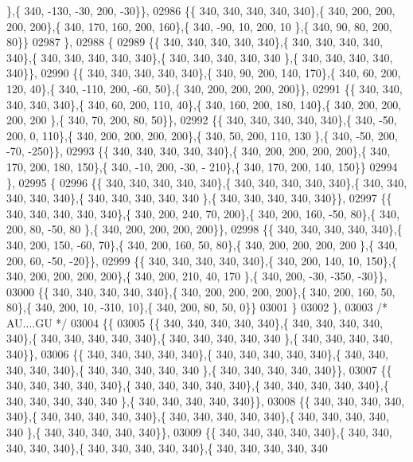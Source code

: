 \begin{DoxyCode}
      \},\{ 340, -130, -30, 200, -30\}\},
02986 \{\{ 340, 340, 340, 340, 340\},\{ 340, 200, 200, 200, 200\},\{ 340, 170, 160, 200, 160\},\{ 340, -90,  10, 200,  10
      \},\{ 340,  90,  80, 200,  80\}\}
02987 \},
02988 \{
02989 \{\{ 340, 340, 340, 340, 340\},\{ 340, 340, 340, 340, 340\},\{ 340, 340, 340, 340, 340\},\{ 340, 340, 340, 340, 340
      \},\{ 340, 340, 340, 340, 340\}\},
02990 \{\{ 340, 340, 340, 340, 340\},\{ 340,  90, 200, 140, 170\},\{ 340,  60, 200, 120,  40\},\{ 340, -110, 200, -60,  
      50\},\{ 340, 200, 200, 200, 200\}\},
02991 \{\{ 340, 340, 340, 340, 340\},\{ 340,  60, 200, 110,  40\},\{ 340, 160, 200, 180, 140\},\{ 340, 200, 200, 200, 200
      \},\{ 340,  70, 200,  80,  50\}\},
02992 \{\{ 340, 340, 340, 340, 340\},\{ 340, -50, 200,   0, 110\},\{ 340, 200, 200, 200, 200\},\{ 340,  50, 200, 110, 130
      \},\{ 340, -50, 200, -70, -250\}\},
02993 \{\{ 340, 340, 340, 340, 340\},\{ 340, 200, 200, 200, 200\},\{ 340, 170, 200, 180, 150\},\{ 340, -10, 200, -30, -
      210\},\{ 340, 170, 200, 140, 150\}\}
02994 \},
02995 \{
02996 \{\{ 340, 340, 340, 340, 340\},\{ 340, 340, 340, 340, 340\},\{ 340, 340, 340, 340, 340\},\{ 340, 340, 340, 340, 340
      \},\{ 340, 340, 340, 340, 340\}\},
02997 \{\{ 340, 340, 340, 340, 340\},\{ 340, 200, 240,  70, 200\},\{ 340, 200, 160, -50,  80\},\{ 340, 200,  80, -50,  80
      \},\{ 340, 200, 200, 200, 200\}\},
02998 \{\{ 340, 340, 340, 340, 340\},\{ 340, 200, 150, -60,  70\},\{ 340, 200, 160,  50,  80\},\{ 340, 200, 200, 200, 200
      \},\{ 340, 200,  60, -50, -20\}\},
02999 \{\{ 340, 340, 340, 340, 340\},\{ 340, 200, 140,  10, 150\},\{ 340, 200, 200, 200, 200\},\{ 340, 200, 210,  40, 170
      \},\{ 340, 200, -30, -350, -30\}\},
03000 \{\{ 340, 340, 340, 340, 340\},\{ 340, 200, 200, 200, 200\},\{ 340, 200, 160,  50,  80\},\{ 340, 200,  10, -310,  
      10\},\{ 340, 200,  80,  50,   0\}\}
03001 \}
03002 \},
03003 \textcolor{comment}{/* AU....GU */}
03004 \{\{
03005 \{\{ 340, 340, 340, 340, 340\},\{ 340, 340, 340, 340, 340\},\{ 340, 340, 340, 340, 340\},\{ 340, 340, 340, 340, 340
      \},\{ 340, 340, 340, 340, 340\}\},
03006 \{\{ 340, 340, 340, 340, 340\},\{ 340, 340, 340, 340, 340\},\{ 340, 340, 340, 340, 340\},\{ 340, 340, 340, 340, 340
      \},\{ 340, 340, 340, 340, 340\}\},
03007 \{\{ 340, 340, 340, 340, 340\},\{ 340, 340, 340, 340, 340\},\{ 340, 340, 340, 340, 340\},\{ 340, 340, 340, 340, 340
      \},\{ 340, 340, 340, 340, 340\}\},
03008 \{\{ 340, 340, 340, 340, 340\},\{ 340, 340, 340, 340, 340\},\{ 340, 340, 340, 340, 340\},\{ 340, 340, 340, 340, 340
      \},\{ 340, 340, 340, 340, 340\}\},
03009 \{\{ 340, 340, 340, 340, 340\},\{ 340, 340, 340, 340, 340\},\{ 340, 340, 340, 340, 340\},\{ 340, 340, 340, 340, 340

\end{DoxyCode}
